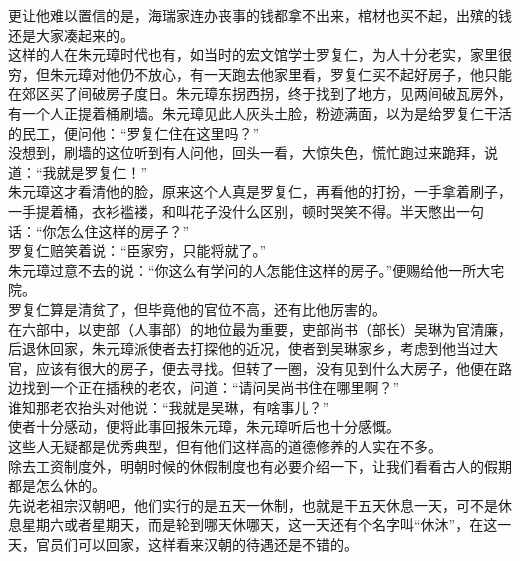 \begin{multicols}{\theparacolNo}
更让他难以置信的是，海瑞家连办丧事的钱都拿不出来，棺材也买不起，出殡的钱还是大家凑起来的。\\

这样的人在朱元璋时代也有，如当时的宏文馆学士罗复仁，为人十分老实，家里很穷，但朱元璋对他仍不放心，有一天跑去他家里看，罗复仁买不起好房子，他只能在郊区买了间破房子度日。朱元璋东拐西拐，终于找到了地方，见两间破瓦房外，有一个人正提着桶刷墙。朱元璋见此人灰头土脸，粉迹满面，以为是给罗复仁干活的民工，便问他：“罗复仁住在这里吗？”\\

没想到，刷墙的这位听到有人问他，回头一看，大惊失色，慌忙跑过来跪拜，说道：“我就是罗复仁！”\\

朱元璋这才看清他的脸，原来这个人真是罗复仁，再看他的打扮，一手拿着刷子，一手提着桶，衣衫褴褛，和叫花子没什么区别，顿时哭笑不得。半天憋出一句话：“你怎么住这样的房子？”\\

罗复仁赔笑着说：“臣家穷，只能将就了。”\\

朱元璋过意不去的说：“你这么有学问的人怎能住这样的房子。”便赐给他一所大宅院。\\

罗复仁算是清贫了，但毕竟他的官位不高，还有比他厉害的。\\

在六部中，以吏部（人事部）的地位最为重要，吏部尚书（部长）吴琳为官清廉，后退休回家，朱元璋派使者去打探他的近况，使者到吴琳家乡，考虑到他当过大官，应该有很大的房子，便去寻找。但转了一圈，没有见到什么大房子，他便在路边找到一个正在插秧的老农，问道：“请问吴尚书住在哪里啊？”\\

谁知那老农抬头对他说：“我就是吴琳，有啥事儿？”\\

使者十分感动，便将此事回报朱元璋，朱元璋听后也十分感慨。\\

这些人无疑都是优秀典型，但有他们这样高的道德修养的人实在不多。\\

除去工资制度外，明朝时候的休假制度也有必要介绍一下，让我们看看古人的假期都是怎么休的。\\

先说老祖宗汉朝吧，他们实行的是五天一休制，也就是干五天休息一天，可不是休息星期六或者星期天，而是轮到哪天休哪天，这一天还有个名字叫“休沐”，在这一天，官员们可以回家，这样看来汉朝的待遇还是不错的。\\


\end{multicols}
